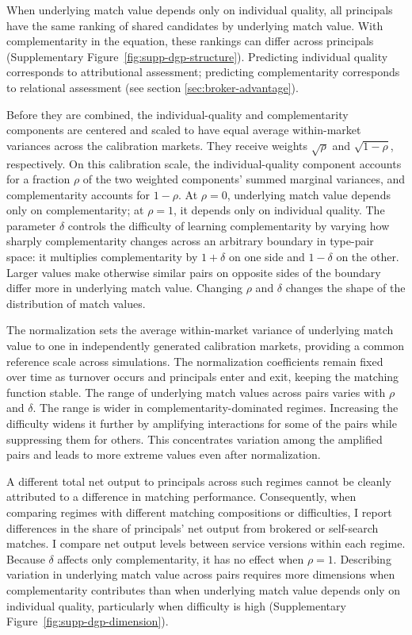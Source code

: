 When underlying match value depends only on individual quality, all principals have the same ranking of shared candidates by underlying match value. With complementarity in the equation, these rankings can differ across principals (Supplementary Figure~\ref{fig:supp-dgp-structure}). Predicting individual quality corresponds to attributional assessment; predicting complementarity corresponds to relational assessment (see section \ref{sec:broker-advantage}).

Before they are combined, the individual-quality and complementarity components are centered and scaled to have equal average within-market variances across the calibration markets. They receive weights $\sqrt{\rho}$ and $\sqrt{1-\rho}$, respectively. On this calibration scale, the individual-quality component accounts for a fraction $\rho$ of the two weighted components' summed marginal variances, and complementarity accounts for $1-\rho$. At $\rho=0$, underlying match value depends only on complementarity; at $\rho=1$, it depends only on individual quality. The parameter $\delta$ controls the difficulty of learning complementarity by varying how sharply complementarity changes across an arbitrary boundary in type-pair space: it multiplies complementarity by $1+\delta$ on one side and $1-\delta$ on the other. Larger values make otherwise similar pairs on opposite sides of the boundary differ more in underlying match value. Changing $\rho$ and $\delta$ changes the shape of the distribution of match values.

The normalization sets the average within-market variance of underlying match value to one in independently generated calibration markets, providing a common reference scale across simulations. The normalization coefficients remain fixed over time as turnover occurs and principals enter and exit, keeping the matching function stable. The range of underlying match values across pairs varies with $\rho$ and $\delta$. The range is wider in complementarity-dominated regimes. Increasing the difficulty widens it further by amplifying interactions for some of the pairs while suppressing them for others. This concentrates variation among the amplified pairs and leads to more extreme values even after normalization.

A different total net output to principals across such regimes cannot be cleanly attributed to a difference in matching performance. Consequently, when comparing regimes with different matching compositions or difficulties, I report differences in the share of principals' net output from brokered or self-search matches. I compare net output levels between service versions within each regime. Because $\delta$ affects only complementarity, it has no effect when $\rho=1$. Describing variation in underlying match value across pairs requires more dimensions when complementarity contributes than when underlying match value depends only on individual quality, particularly when difficulty is high (Supplementary Figure~\ref{fig:supp-dgp-dimension}).

